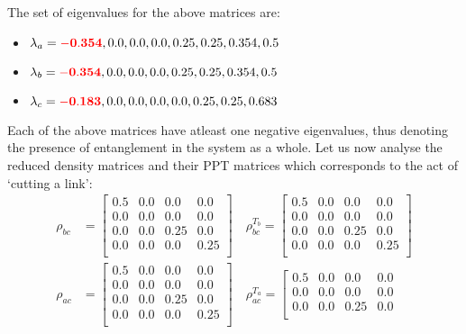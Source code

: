 \documentclass{scrartcl}
\begin{document}
    The set of eigenvalues for the above matrices are:
    \begin{itemize}
        \item $ \lambda_a = \mathbf{\mathcolor{red}{-0.354}}, 0.0, 0.0, 0.0, 0.25, 0.25, 0.354, 0.5$
        \item $ \lambda_b = \mathbf{\mathcolor{red}{-0.354}}, 0.0, 0.0, 0.0, 0.25, 0.25, 0.354, 0.5$
        \item $ \lambda_c = \mathbf{\mathcolor{red}{-0.183}}, 0.0, 0.0, 0.0, 0.0, 0.25, 0.25, 0.683$
    \end{itemize}
Each of the above matrices have atleast one negative eigenvalues, thus denoting the presence of entanglement in the system as a whole. Let us now analyse the reduced density matrices and their PPT matrices which corresponds to the act of `cutting a link': 
\begin{align*}
    \rho_{bc} &=
    \left[
    \begin{array}{cccc}
    0.5 & 0.0 & 0.0 & 0.0 \\
    0.0 & 0.0 & 0.0 & 0.0 \\
    0.0 & 0.0 & 0.25 & 0.0 \\
    0.0 & 0.0 & 0.0 & 0.25 \\
    \end{array}
    \right] \quad \rho_{bc}^{T_b} = \left[
        \begin{array}{cccc}
        0.5 & 0.0 & 0.0 & 0.0 \\
        0.0 & 0.0 & 0.0 & 0.0 \\
        0.0 & 0.0 & 0.25 & 0.0 \\
        0.0 & 0.0 & 0.0 & 0.25 \\
        \end{array}
        \right]
    \\
    \rho_{ac} &=
    \left[
    \begin{array}{cccc}
    0.5 & 0.0 & 0.0 & 0.0 \\
    0.0 & 0.0 & 0.0 & 0.0 \\
    0.0 & 0.0 & 0.25 & 0.0 \\
    0.0 & 0.0 & 0.0 & 0.25 \\
    \end{array}
    \right] \quad \rho_{ac}^{T_a} =\left[
        \begin{array}{cccc}
        0.5 & 0.0 & 0.0 & 0.0 \\
        0.0 & 0.0 & 0.0 & 0.0 \\
        0.0 & 0.0 & 0.25 & 0.0 \\

\end{array}
\end{align*}
\end{document}
